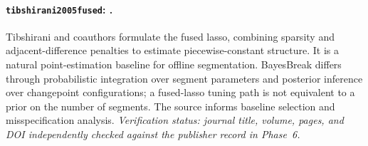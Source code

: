 \paragraph{\texttt{tibshirani2005fused}: \citet{tibshirani2005fused}.}
Tibshirani and coauthors formulate the fused lasso, combining sparsity and adjacent-difference penalties to estimate piecewise-constant structure. It is a natural point-estimation baseline for offline segmentation. BayesBreak differs through probabilistic integration over segment parameters and posterior inference over changepoint configurations; a fused-lasso tuning path is not equivalent to a prior on the number of segments. The source informs baseline selection and misspecification analysis. \textit{Verification status: journal title, volume, pages, and DOI independently checked against the publisher record in Phase~6.}

